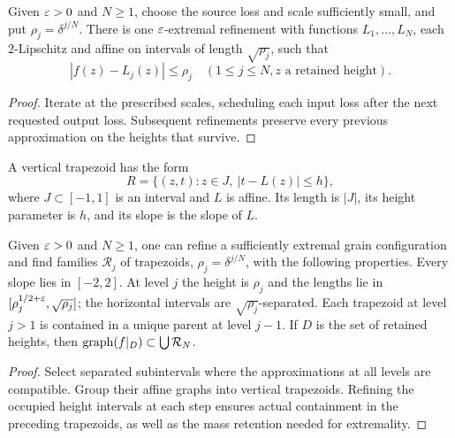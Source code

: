 \begin{lemma}
\label{lem:affine-hierarchy}
Given $\varepsilon>0$ and $N\geq1$, choose the source loss and scale
sufficiently small, and put $\rho_j=\delta^{j/N}$.
There is one $\varepsilon$-extremal refinement with functions
$L_1,\ldots,L_N$, each $2$-Lipschitz and affine on intervals of length
$\sqrt{\rho_j}$, such that
\[
 |f(z)-L_j(z)|\leq\rho_j
 \quad(1\leq j\leq N, z\text{ a retained height}).
\]
\end{lemma}
\begin{proof}
Iterate at the prescribed scales, scheduling each input loss after
the next requested output loss. Subsequent refinements preserve every
previous approximation on the heights that survive.
\end{proof}

\begin{definition}
\label{def:trapezoid}
\leanok
A vertical trapezoid has the form
\[
        R=\{(z,t):z\in J,\ |t-L(z)|\leq h\},
\]
where $J\subset[-1,1]$ is an interval and $L$ is affine. Its length
is $|J|$, its height parameter is $h$, and its slope is the slope
of $L$.
\end{definition}

\begin{corollary}
\label{cor:trapezoid-hierarchy}
Given $\varepsilon>0$ and $N\geq1$, one can refine a sufficiently extremal
grain configuration and find families $\mathcal R_j$ of trapezoids,
$\rho_j=\delta^{j/N}$, with the following properties. Every slope
lies in $[-2,2]$. At level $j$ the height is $\rho_j$ and the lengths
lie in $[\rho_j^{1/2+\varepsilon},\sqrt{\rho_j}]$; the horizontal intervals
are $\sqrt{\rho_j}$-separated. Each trapezoid at level $j>1$ is
contained in a unique parent at level $j-1$. If $D$ is the set of
retained heights, then $\operatorname{graph}(f|_D)\subset\bigcup\mathcal R_N$.
\end{corollary}
\begin{proof}
Select separated subintervals where the approximations at all levels
are compatible. Group their affine graphs into vertical trapezoids.
Refining the occupied height intervals at each step ensures actual
containment in the preceding trapezoids, as well as the mass retention
needed for extremality.
\end{proof}

